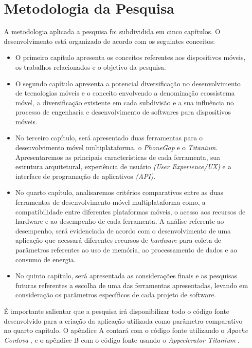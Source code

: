 \section{Metodologia da Pesquisa} %
\label{sec:metodologia_de_pesquisa}
A metodologia aplicada a pesquisa foi subdividida em cinco capítulos. O
desenvolvimento está organizado de acordo com os seguintes conceitos:
\begin{itemize}
  \item O primeiro capítulo apresenta os conceitos referentes
    aos dispositivos móveis, os trabalhos relacionados e o objetivo da pesquisa.
  \item O segundo capítulo apresenta a potencial diversificação no
   desenvolvimento de tecnologias móveis e o conceito envolvendo a
   denominação ecossistema móvel, a diversificação existente em cada subdivisão
   e a sua influência no processo de engenharia e desenvolvimento de softwares
   para dispositivos móveis.
  \item No terceiro capítulo, será apresentado duas ferramentas para o
   desenvolvimento móvel multiplataforma, o \textit{PhoneGap} e o
   \textit{Titanium}. Apresentaremos as principais características de cada
   ferramenta, sua estrutura arquitetural, experiência de usuário
   \textit{(User Experience/UX)} e a interface de programação de aplicativos
   \textit{(API)}.
  \item No quarto capítulo, analisaremos critérios comparativos entre as
   duas ferramentas de desenvolvimento móvel multiplataforma como, a
   compatibilidade entre diferentes plataformas móveis, o acesso aos recursos de
   hardware e ao desempenho de cada ferramenta. A análise referente ao
   desempenho, será evidenciada de acordo com o desenvolvimento de uma
   aplicação que acessará diferentes recursos de \textit{hardware} para coleta de
   parâmetros referentes ao uso de memória, ao processamento de dados e ao
   consumo de energia.
  \item No quinto capítulo, será apresentada as considerações finais e as
   pesquisas futuras referentes a escolha de uma das ferramentas apresentadas,
   levando em consideração os parâmetros específicos de cada projeto de software.
\end{itemize}

É importante salientar que a pesquisa irá disponibilizar todo o código fonte
desenvolvido para a criação da aplicação utilizada como parâmetro comparativo
no quarto capítulo. O apêndice A contará com o código fonte utilizando o \textit{Apache Cordova} \textsuperscript{\texttrademark}, e o apêndice B com o código
fonte usando o \textit{Appcelerator Titanium} \textsuperscript{\texttrademark}.


